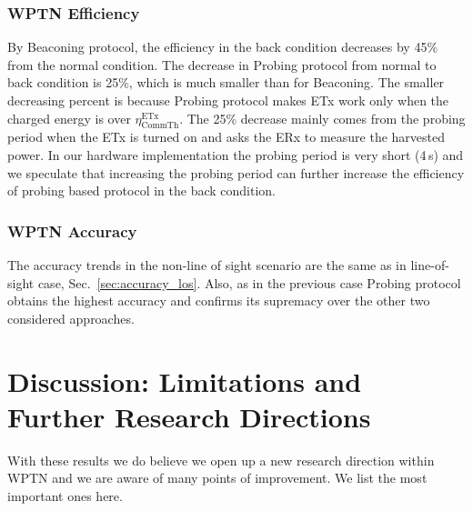 \documentclass[11pt,draftclsnofoot,journal,onecolumn]{IEEEtran}
\newcommand{\txRssiThreshold}{$\eta^\text{ETx}_\text{CommTh}$}
\begin{document}
\subsubsection{WPTN Efficiency}
\label{sec:efficiency_nlos}

By Beaconing protocol, the efficiency in the back condition decreases by 45\% from the normal condition.
The decrease in Probing protocol from normal to back condition is 25\%, which is much smaller than for Beaconing. The smaller decreasing percent is because Probing protocol makes ETx work only when the charged energy is over \txRssiThreshold. The 25\% decrease mainly comes from the probing period when the ETx is turned on and asks the ERx to measure the harvested power. In our hardware implementation the probing period is very short (4\,s) and we speculate that increasing the probing period can further increase the efficiency of probing based protocol in the back condition.

\subsubsection{WPTN Accuracy}
\label{sec:accuracy_nlos}

The accuracy trends in the non-line of sight scenario are the same as in line-of-sight case, Sec.~\ref{sec:accuracy_los}. Also, as in the previous case Probing protocol obtains the highest accuracy and confirms its supremacy over the other two considered approaches.

\section{Discussion: Limitations and Further Research Directions}
\label{sec:discussion}

With these results we do believe we open up a new research direction within WPTN and we are aware of many points of improvement. We list the most important ones here.
\end{document}
